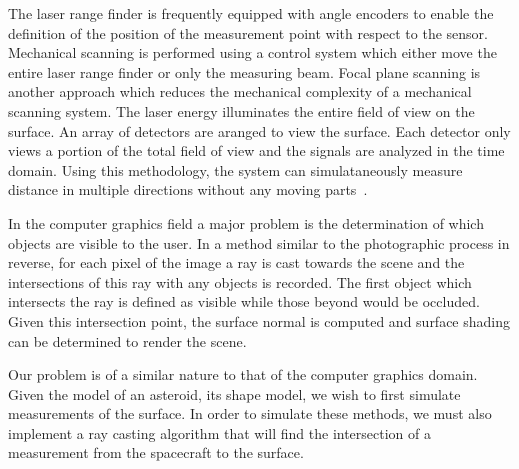 The laser range finder is frequently equipped with angle encoders to enable the definition of the position of the measurement point with respect to the sensor. 
Mechanical scanning is performed using a control system which  either move the entire laser range finder or only the measuring beam.
Focal plane scanning is another approach which reduces the mechanical complexity of a mechanical scanning system.
The laser energy illuminates the entire field of view on the surface.
An array of detectors are aranged to view the surface.
Each detector only views a portion of the total field of view and the signals are analyzed in the time domain.
Using this methodology, the system can simulataneously measure distance in multiple directions without any moving parts~\cite{amann2001}.

In the computer graphics field a major problem is the determination of which objects are visible to the user.
In a method similar to the photographic process in reverse, for each pixel of the image a ray is cast towards the scene and the intersections of this ray with any objects is recorded.
The first object which intersects the ray is defined as visible while those beyond would be occluded.
Given this intersection point, the surface normal is computed and surface shading can be determined to render the scene.

Our problem is of a similar nature to that of the computer graphics domain.
Given the model of an asteroid, its shape model, we wish to first simulate measurements of the surface. 
In order to simulate these methods, we must also implement a ray casting algorithm that will find the intersection of a measurement from the spacecraft to the surface. 

